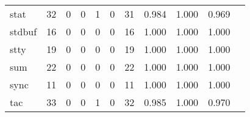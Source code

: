 \begin{longtable}{lp{1.20cm}p{1.20cm}p{1.20cm}p{1.20cm}p{1.20cm}p{1.20cm}p{1.20cm}p{1.20cm}p{1.20cm}p{1.20cm}}
stat      &                                    32 &                                                  0 &                                                  0 &                                                  1 &                                                  0 &                                                 31 &                                         0.984 &                                              1.000 &                                              0.969 \\
stdbuf    &                                    16 &                                                  0 &                                                  0 &                                                  0 &                                                  0 &                                                 16 &                                         1.000 &                                              1.000 &                                              1.000 \\
stty      &                                    19 &                                                  0 &                                                  0 &                                                  0 &                                                  0 &                                                 19 &                                         1.000 &                                              1.000 &                                              1.000 \\
sum       &                                    22 &                                                  0 &                                                  0 &                                                  0 &                                                  0 &                                                 22 &                                         1.000 &                                              1.000 &                                              1.000 \\
sync      &                                    11 &                                                  0 &                                                  0 &                                                  0 &                                                  0 &                                                 11 &                                         1.000 &                                              1.000 &                                              1.000 \\
tac       &                                    33 &                                                  0 &                                                  0 &                                                  1 &                                                  0 &                                                 32 &                                         0.985 &                                              1.000 &                                              0.970 \\

\end{longtable}
